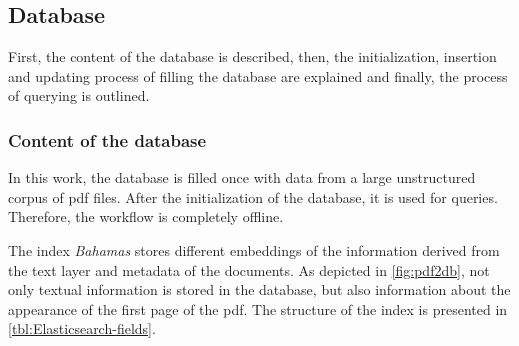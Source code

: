 \subsection{Database}\label{subsec:impl-db}
First, the content of the database \databaseName{} is described, then, the initialization, insertion and updating process of filling the database are explained 
and finally, the process of querying is outlined.

\subsubsection*{Content of the database}
In this work, the database is filled once with data from a large unstructured corpus of \ac{pdf} files.
After the initialization of the database, it is used for queries. 
Therefore, the workflow is completely offline.

The index \textit{Bahamas} stores different embeddings of the information derived from the text layer and metadata of the documents.
As depicted in \autoref{fig:pdf2db}, not only textual information is stored in the database, 
but also information about the appearance of the first page of the \ac{pdf}.
The structure of the index is presented in \autoref{tbl:Elasticsearch-fields}.

